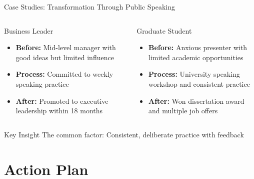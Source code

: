 \documentclass{beamer}
\begin{document}
\begin{frame}{Case Studies: Transformation Through Public Speaking}
    \begin{columns}
        \begin{block}{Business Leader}
            \begin{itemize}
                \item \textbf{Before:} Mid-level manager with good ideas but limited influence
                \item \textbf{Process:} Committed to weekly speaking practice
                \item \textbf{After:} Promoted to executive leadership within 18 months
            \end{itemize}
        \end{block}
        
        \begin{block}{Graduate Student}
            \begin{itemize}
                \item \textbf{Before:} Anxious presenter with limited academic opportunities
                \item \textbf{Process:} University speaking workshop and consistent practice
                \item \textbf{After:} Won dissertation award and multiple job offers
            \end{itemize}
        \end{block}
    \end{columns}
    
    \begin{alertblock}{Key Insight}
        \centering
        The common factor: Consistent, deliberate practice with feedback
    \end{alertblock}
\end{frame}

\section{Action Plan}
\end{document}
